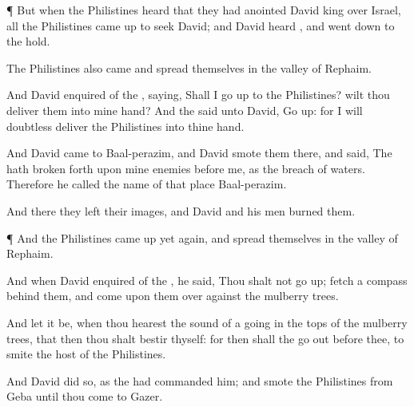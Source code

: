 {\par }{\PP {}¶ But when the
Philistines
heard that they had
anointed
David
king over
Israel, all the
Philistines came
up to
seek
David; and
David
heard
{}, and went
down to the
hold.

The
Philistines also
came and
spread themselves in the
valley of
Rephaim.

And
David
enquired of the
{},
saying, Shall I go
up to the
Philistines? wilt thou
deliver them into mine
hand? And the
{}
said unto
David, Go
up: for I will
doubtless
deliver the
Philistines into thine
hand.

And
David
came to
Baal-perazim, and
David
smote them there, and
said, The
{} hath broken
forth upon mine
enemies
before me, as the
breach of
waters. Therefore he
called the
name of that
place
Baal-perazim.

And there they
left their
images, and
David and his
men
burned them.


\par }{\PP {}¶ And the
Philistines came
up yet
again, and
spread themselves in the
valley of
Rephaim.

And when
David
enquired of the
{}, he
said, Thou shalt not go
up;
{} fetch a
compass
behind them, and
come upon them over
against the mulberry
trees.

And let it be, when thou
hearest the
sound of a
going in the
tops of the mulberry
trees, that then thou shalt
bestir thyself: for then shall the
{} go
out
before thee, to
smite the
host of the
Philistines.

And
David did
so, as the
{} had
commanded him; and
smote the
Philistines from
Geba until thou
come to
Gazer.




\par }
